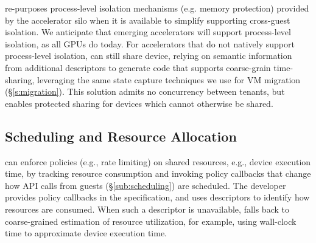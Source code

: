 \AvA re-purposes process-level isolation mechanisms (e.g. memory protection)
provided by the accelerator silo when it is available to simplify supporting cross-guest
isolation. We anticipate that emerging accelerators will support process-level isolation, as all GPUs do today.
For accelerators that do not natively support process-level isolation,
\AvA can still share device, relying on semantic information from additional \Lapis descriptors
to generate code that supports coarse-grain time-sharing, leveraging the same state capture techniques we use for VM migration (\S\ref{s:migration}).
This solution admits no concurrency between tenants, but enables protected
sharing for devices which cannot otherwise be shared.

\subsection{Scheduling and Resource Allocation}
\label{s:rate_limit}
\label{s:api_throttling}

\AvA can enforce policies (e.g., rate limiting) on shared resources,
e.g., device execution time, by tracking resource consumption and invoking
policy callbacks that change how API calls from
guests (\S\ref{sub:scheduling}) are scheduled.
The developer provides policy callbacks in the \Lapis specification, and uses descriptors to identify how resources are consumed.
When such a descriptor is unavailable, \AvA falls back to coarse-grained
estimation of resource utilization, for example, using wall-clock time to approximate device execution time.

